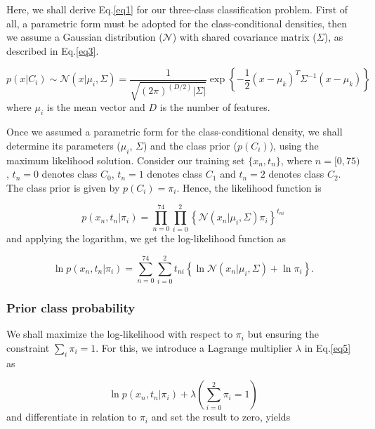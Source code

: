 \documentclass{article}
\begin{document}
Here, we shall derive Eq.\eqref{eq1} for our three-class classification problem. First of all, a parametric form must be adopted for the class-conditional densities, then we assume a Gaussian distribution ($\mathcal{N}$) with shared covariance matrix ($\Sigma$), as described in Eq.\eqref{eq3}.

\begin{equation}
  \label{eq3}
  p(x|C_{i}) \sim \mathcal{N}(x|\mu_{i},\Sigma) = 
  \dfrac{1}{\sqrt{(2\pi)^{(D/2)}|\Sigma|}}
  \exp\left\{-\dfrac{1}{2}(x-\mu_k)^{T}\Sigma^{-1}(x-\mu_k)\right\}
\end{equation}
where $\mu_{i}$ is the mean vector and $D$ is the number of features.

Once we assumed a parametric form for the class-conditional density, we shall determine its parameters ($\mu_i$, $\Sigma$) and the class prior ($p(C_i)$), using the maximum likelihood solution. 
Consider our training set $\{x_n, t_n\}$, where $n = [0,75)$, $t_n = 0$ denotes class $C_0$, $t_n = 1$ denotes class $C_1$ and $t_n = 2$ denotes class $C_2$. The class prior is given by $p(C_i) = \pi_i$. Hence, the likelihood function is

\begin{equation}
\label{eq4}
p({x_n, t_n}| {\pi_i}) = \prod_{n=0}^{74} \prod_{i=0}^{2} \left\{\mathcal{N}(x_n|\mu_{i},\Sigma)\pi_i\right\}^{t_{ni}}
\end{equation}
and applying the logarithm, we get the log-likelihood function as

\begin{equation}
\label{eq5}
\ln{p({x_n, t_n}| {\pi_i})} = \sum_{n=0}^{74} \sum_{i=0}^{2} t_{ni} \left\{ \ln{\mathcal{N}(x_n|\mu_{i},\Sigma)} + \ln{\pi_i} \right\}.
\end{equation}

\subsubsection{Prior class probability}

We shall maximize the log-likelihood with respect to $\pi_i$ but ensuring the constraint $\sum_i \pi_i = 1$. For this, we introduce a Lagrange multiplier $\lambda$ in Eq.\eqref{eq5} as 

\begin{equation}
\label{eq6}
\ln{p({x_n, t_n}| {\pi_i})} + \lambda \left(\sum_{i=0}^2 \pi_i = 1\right)
\end{equation}
and differentiate in relation to $\pi_i$ and set the result to zero, yields
\end{document}
